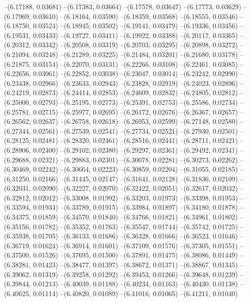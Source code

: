 --(6.17188, 0.03681)
--(6.17383, 0.03664)
--(6.17578, 0.03647)
--(6.17773, 0.03629)
--(6.17969, 0.03610)
--(6.18164, 0.03590)
--(6.18359, 0.03568)
--(6.18555, 0.03546)
--(6.18750, 0.03524)
--(6.18945, 0.03502)
--(6.19141, 0.03479)
--(6.19336, 0.03456)
--(6.19531, 0.03433)
--(6.19727, 0.03411)
--(6.19922, 0.03388)
--(6.20117, 0.03365)
--(6.20312, 0.03342)
--(6.20508, 0.03319)
--(6.20703, 0.03295)
--(6.20898, 0.03272)
--(6.21094, 0.03248)
--(6.21289, 0.03225)
--(6.21484, 0.03201)
--(6.21680, 0.03178)
--(6.21875, 0.03154)
--(6.22070, 0.03131)
--(6.22266, 0.03108)
--(6.22461, 0.03085)
--(6.22656, 0.03061)
--(6.22852, 0.03038)
--(6.23047, 0.03014)
--(6.23242, 0.02990)
--(6.23438, 0.02966)
--(6.23633, 0.02943)
--(6.23828, 0.02919)
--(6.24023, 0.02896)
--(6.24219, 0.02873)
--(6.24414, 0.02853)
--(6.24609, 0.02832)
--(6.24805, 0.02812)
--(6.25000, 0.02793)
--(6.25195, 0.02773)
--(6.25391, 0.02753)
--(6.25586, 0.02734)
--(6.25781, 0.02715)
--(6.25977, 0.02695)
--(6.26172, 0.02676)
--(6.26367, 0.02657)
--(6.26562, 0.02637)
--(6.26758, 0.02618)
--(6.26953, 0.02599)
--(6.27148, 0.02580)
--(6.27344, 0.02561)
--(6.27539, 0.02541)
--(6.27734, 0.02521)
--(6.27930, 0.02501)
--(6.28125, 0.02481)
--(6.28320, 0.02461)
--(6.28516, 0.02441)
--(6.28711, 0.02421)
--(6.28906, 0.02400)
--(6.29102, 0.02380)
--(6.29297, 0.02361)
--(6.29492, 0.02341)
--(6.29688, 0.02321)
--(6.29883, 0.02301)
--(6.30078, 0.02281)
--(6.30273, 0.02262)
--(6.30469, 0.02242)
--(6.30664, 0.02223)
--(6.30859, 0.02204)
--(6.31055, 0.02185)
--(6.31250, 0.02166)
--(6.31445, 0.02147)
--(6.31641, 0.02128)
--(6.31836, 0.02109)
--(6.32031, 0.02090)
--(6.32227, 0.02070)
--(6.32422, 0.02051)
--(6.32617, 0.02032)
--(6.32812, 0.02012)
--(6.33008, 0.01992)
--(6.33203, 0.01973)
--(6.33398, 0.01953)
--(6.33594, 0.01934)
--(6.33789, 0.01915)
--(6.33984, 0.01897)
--(6.34180, 0.01878)
--(6.34375, 0.01859)
--(6.34570, 0.01840)
--(6.34766, 0.01821)
--(6.34961, 0.01802)
--(6.35156, 0.01782)
--(6.35352, 0.01763)
--(6.35547, 0.01744)
--(6.35742, 0.01725)
--(6.35938, 0.01705)
--(6.36133, 0.01686)
--(6.36328, 0.01666)
--(6.36523, 0.01646)
--(6.36719, 0.01624)
--(6.36914, 0.01601)
--(6.37109, 0.01576)
--(6.37305, 0.01551)
--(6.37500, 0.01526)
--(6.37695, 0.01500)
--(6.37891, 0.01475)
--(6.38086, 0.01449)
--(6.38281, 0.01423)
--(6.38477, 0.01397)
--(6.38672, 0.01371)
--(6.38867, 0.01345)
--(6.39062, 0.01319)
--(6.39258, 0.01292)
--(6.39453, 0.01266)
--(6.39648, 0.01239)
--(6.39844, 0.01213)
--(6.40039, 0.01188)
--(6.40234, 0.01163)
--(6.40430, 0.01138)
--(6.40625, 0.01114)
--(6.40820, 0.01089)
--(6.41016, 0.01065)
--(6.41211, 0.01040)
